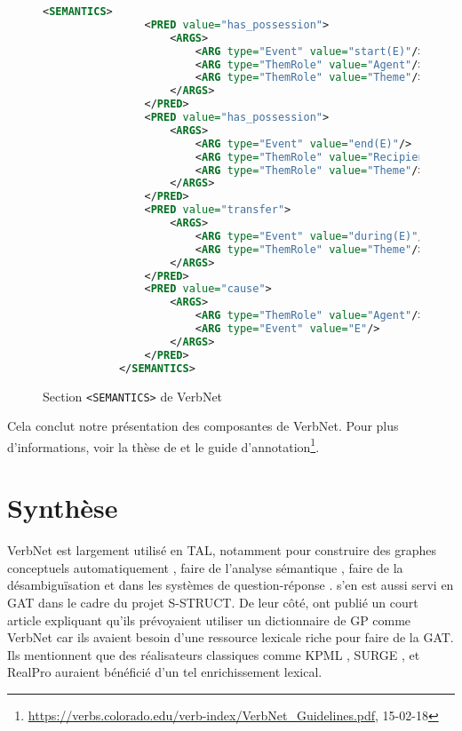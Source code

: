 \begin{figure}[htb]
  \caption{Section \texttt{<SEMANTICS>} de VerbNet}
	\label{cadresem}
\begin{lstlisting}[language=Xml]
<SEMANTICS>
                <PRED value="has_possession">
                    <ARGS>
                        <ARG type="Event" value="start(E)"/>
                        <ARG type="ThemRole" value="Agent"/>
                        <ARG type="ThemRole" value="Theme"/>
                    </ARGS>
                </PRED>
                <PRED value="has_possession">
                    <ARGS>
                        <ARG type="Event" value="end(E)"/>
                        <ARG type="ThemRole" value="Recipient"/>
                        <ARG type="ThemRole" value="Theme"/>
                    </ARGS>
                </PRED>
                <PRED value="transfer">
                    <ARGS>
                        <ARG type="Event" value="during(E)"/>
                        <ARG type="ThemRole" value="Theme"/>
                    </ARGS>
                </PRED>
                <PRED value="cause">
                    <ARGS>
                        <ARG type="ThemRole" value="Agent"/>
                        <ARG type="Event" value="E"/>
                    </ARGS>
                </PRED>
            </SEMANTICS>
\end{lstlisting}
\end{figure}

Cela conclut notre présentation des composantes de VerbNet. Pour plus d'informations, voir la thèse de \cite{SchulerVerbnetBroadcoverageComprehensive2005} et le guide d'annotation\footnote{\url{https://verbs.colorado.edu/verb-index/VerbNet_Guidelines.pdf}, 15-02-18}.



\section{Synthèse}

VerbNet est largement utilisé en \ac{TAL}, notamment pour construire des graphes conceptuels automatiquement \citep{HensmanAutomaticallyBuildingConceptual2004}, faire de l'analyse sémantique \citep{Shi:2005:PPT:2132047.2132058}, faire de la désambiguïsation \citep{AbendSupervisedAlgorithmVerb2008} et dans les systèmes de question-réponse \citep{DBLP:conf/nlpke/WenJH08}. \citep{PfeilAlgorithmsResourcesScalable2016} s'en est aussi servi en \ac{GAT} dans le cadre du projet S-STRUCT. De leur côté, \cite{MilleLargeCoverageDetailed2015} ont publié un court article expliquant qu'ils prévoyaient utiliser un dictionnaire de \ac{GP} comme VerbNet car ils avaient besoin d'une ressource lexicale riche pour faire de la \ac{GAT}. Ils mentionnent que des réalisateurs classiques comme KPML \citep{BatemanEnablingTechnologyMultilingual1997}, SURGE \citep{Elhadad98surge:a}, et RealPro \citep{LavoieFastPortableRealizer1997} auraient bénéficié d'un tel enrichissement lexical.

